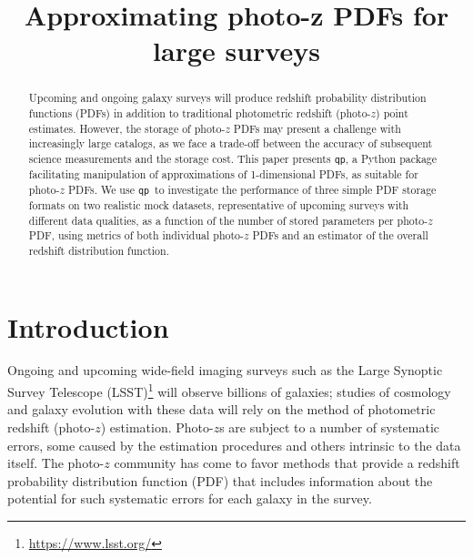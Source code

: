 \documentclass[\docopts]{\docclass}
\newcommand{\qp}{\texttt{qp}}
\newcommand{\pz}{photo-$z$ PDF}
\begin{document}
\title{ Approximating photo-z PDFs for large surveys }


\begin{abstract}

Upcoming and ongoing galaxy surveys will produce redshift probability 
distribution functions (PDFs) in addition to traditional photometric redshift 
(photo-$z$) point estimates.
However, the storage of \pz s may present a challenge with increasingly large 
catalogs, as we face a trade-off between the accuracy of subsequent science 
measurements and the storage cost.
This paper presents \qp, a Python package facilitating manipulation of 
approximations of 1-dimensional PDFs, as suitable for \pz s.
We use \qp\ to investigate the performance of three simple PDF storage formats 
on two realistic mock datasets, representative of upcoming surveys with 
different data qualities, as a function of the number of stored parameters per 
\pz, using metrics of both individual \pz s and an estimator of the overall 
redshift distribution function.

\end{abstract}


\maketitlepost





\section{Introduction}
\label{sec:intro}


Ongoing and upcoming wide-field imaging surveys such as the Large Synoptic 
Survey Telescope 
(LSST)\footnote{\url{https://www.lsst.org/}}\citep{ivezic_lsst:_2008} will 
observe billions of galaxies; studies of cosmology and galaxy evolution with 
these data will rely on the method of photometric redshift (photo-$z$) 
estimation.
Photo-$z$s are subject to a number of systematic errors, some caused by the 
estimation procedures and others intrinsic to the data itself.
The photo-$z$ community has come to favor methods that provide a redshift 
probability distribution function (PDF) that includes information about the 
potential for such systematic errors for each galaxy in the survey.
\end{document}
